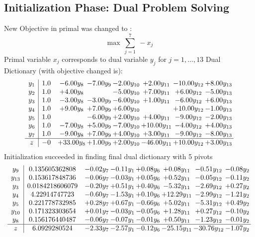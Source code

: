 \documentclass[8pt]{article}
\begin{document}
\subsection{Initialization Phase: Dual Problem Solving}
New Objective in primal was changed to : \[ \max\ \sum_{j=1}^{7}\ - x_j \] 
Primal variable $x_j$ corresponds to dual variable $y_j$ for $j = 1,\ldots,13$
Dual Dictionary (with objective changed is): 
\[\begin{array}{c| c c@{\hskip 2pt} c@{\hskip 2pt} c@{\hskip 2pt} c@{\hskip 2pt} c@{\hskip 2pt} c@{\hskip 2pt} }
 y_{1}   &  1.0 & -6.00 y_{8} & -7.00 y_{9} & -2.00 y_{10} & +  2.00 y_{11} & -10.00 y_{12} & +  8.00 y_{13}\\
 y_{2}   &  1.0 & +  4.00 y_{8} &   & -5.00 y_{10} & +  7.00 y_{11} & +  6.00 y_{12} & -5.00 y_{13}\\
 y_{3}   &  1.0 & -3.00 y_{8} & -3.00 y_{9} & -6.00 y_{10} & +  1.00 y_{11} & -6.00 y_{12} & +  6.00 y_{13}\\
 y_{4}   &  1.0 & +  9.00 y_{8} & +  7.00 y_{9} & +  6.00 y_{10} &   & + 10.00 y_{12} & -1.00 y_{13}\\
 y_{5}   &  1.0  &   & -6.00 y_{9} & +  2.00 y_{10} & +  4.00 y_{11} & -9.00 y_{12} & -2.00 y_{13}\\
 y_{6}   &  1.0 & -7.00 y_{8} & +  5.00 y_{9} & -7.00 y_{10} & + 10.00 y_{11} & -4.00 y_{12} & +  4.00 y_{13}\\
 y_{7}   &  1.0 & -9.00 y_{8} & +  7.00 y_{9} & +  4.00 y_{10} & +  3.00 y_{11} & -9.00 y_{12} & -8.00 y_{13}\\
\hline
z    &  -0 & + 33.00 y_{8} & +  1.00 y_{9} & +  2.00 y_{10} & -46.00 y_{11} & + 10.00 y_{12} & +  3.00 y_{13}\\
\end{array}\]
Initialization succeeded in finding final dual dictionary with 5 pivots
\[\begin{array}{c| c c@{\hskip 2pt} c@{\hskip 2pt} c@{\hskip 2pt} c@{\hskip 2pt} c@{\hskip 2pt} c@{\hskip 2pt} }
 y_{9}   &  0.135605362808 & -0.02 y_{7} & -0.11 y_{1} & +  0.08 y_{6} & +  0.08 y_{11} & -0.51 y_{12} & -0.08 y_{2}\\
 y_{13}   &  0.153617848736 & -0.06 y_{7} & -0.03 y_{1} & +  0.05 y_{6} & +  0.52 y_{11} & -0.05 y_{12} & -0.11 y_{2}\\
 y_{3}   &  0.0184218606079 & -0.20 y_{7} & +  0.51 y_{1} & +  0.40 y_{6} & -5.32 y_{11} & -2.69 y_{12} & +  0.27 y_{2}\\
 y_{4}   &  4.22914747723 & -0.60 y_{7} & -1.53 y_{1} & +  0.10 y_{6} & + 12.29 y_{11} & -2.99 y_{12} & -1.21 y_{2}\\
 y_{5}   &  0.221778732985 & +  0.28 y_{7} & +  0.67 y_{1} & -0.66 y_{6} & +  5.02 y_{11} & -5.31 y_{12} & +  0.49 y_{2}\\
 y_{10}   &  0.171323303654 & +  0.01 y_{7} & -0.03 y_{1} & -0.05 y_{6} & +  1.28 y_{11} & +  0.27 y_{12} & -0.10 y_{2}\\
 y_{8}   &  0.156176440487 & -0.06 y_{7} & -0.07 y_{1} & -0.01 y_{6} & +  0.50 y_{11} & -1.23 y_{12} & -0.01 y_{2}\\
\hline
z    &  6.0929280524 & -2.33 y_{7} & -2.57 y_{1} & -0.12 y_{6} & -25.15 y_{11} & -30.76 y_{12} & -1.07 y_{2}\\
\end{array}\]
\end{document}

